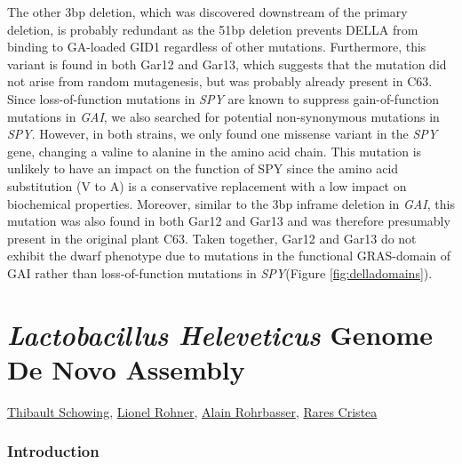 \documentclass[10pt,a4paper]{article}
\begin{document}
\noindent The other 3bp deletion, which was discovered downstream of the primary deletion, is probably redundant as the 51bp deletion prevents DELLA from binding to GA-loaded GID1 regardless of other mutations. Furthermore, this variant is found in both Gar12 and Gar13, which suggests that the mutation did not arise from random mutagenesis, but was probably already present in C63. Since loss-of-function mutations in \textit{SPY} are known to suppress gain-of-function mutations in \textit{GAI}, we also searched for potential non-synonymous mutations in \textit{SPY}. However, in both strains, we only found one missense variant in the \textit{SPY} gene, changing a valine to alanine in the amino acid chain. This mutation is unlikely to have an impact on the function of SPY since the amino acid substitution (V to A) is a conservative replacement with a low impact on biochemical properties. Moreover, similar to the 3bp inframe deletion in \textit{GAI}, this mutation was also found in both Gar12 and Gar13 and was therefore presumably present in the original plant C63. Taken together, Gar12 and Gar13 do not exhibit the dwarf phenotype due to mutations in the functional GRAS-domain of GAI rather than loss-of-function mutations in \textit{SPY}(Figure \ref{fig:delladomains}).





\newpage
\part*{\Large \textit{Lactobacillus Heleveticus} Genome De Novo Assembly}

\href{mailto:thibault.schowing@unifr.ch}{Thibault Schowing}, \href{mailto:lio_roh@students.unibe.ch}{Lionel Rohner},
\href{mailto:alain.rohrbasser.unifr.ch}{Alain Rohrbasser},
\href{mailto:rares.cristea@unifr.ch}{Rares Cristea}\\

\section*{\large Introduction}
\end{document}

